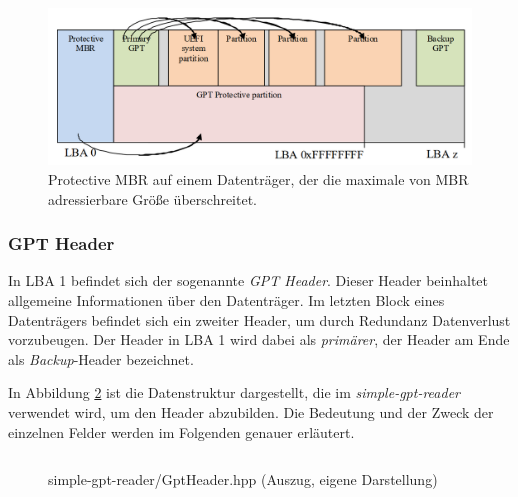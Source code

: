 \begin{figure}[ht!]
    \includegraphics[width=\textwidth]{content/graphics/GPT_Layout_with_protective_MBR_large_disk.png}
    
    \vspace{-0.2cm}

    \caption{Protective MBR auf einem Datenträger, der die maximale von MBR adressierbare Größe überschreitet.\cite{uefi-spec}}
    \label{fig:protective-mbr-large-disk}
\end{figure}


\newpage
\subsubsection{GPT Header}
In LBA 1 befindet sich der sogenannte \textit{GPT Header}.
Dieser Header beinhaltet allgemeine Informationen über den Datenträger.
Im letzten Block eines Datenträgers befindet sich ein zweiter Header, um durch Redundanz Datenverlust vorzubeugen.
Der Header in LBA 1 wird dabei als \textit{primärer}, der Header am Ende als \textit{Backup}-Header bezeichnet.

In Abbildung \ref{fig:GptHeader.hpp} ist die Datenstruktur dargestellt, die im \textit{simple-gpt-reader} verwendet wird, um den Header abzubilden.
Die Bedeutung und der Zweck der einzelnen Felder werden im Folgenden genauer erläutert.

\begin{figure}[ht]
    \inputminted[baselinestretch=1.2, linenos, tabsize=4, breaklines, frame=single]{c++}{content/code/simple-gpt-reader/GptHeader.hpp}
    
    \vspace{-0.5cm}

    \caption{simple-gpt-reader/GptHeader.hpp (Auszug, eigene Darstellung)}
    \label{fig:GptHeader.hpp}
\end{figure}

